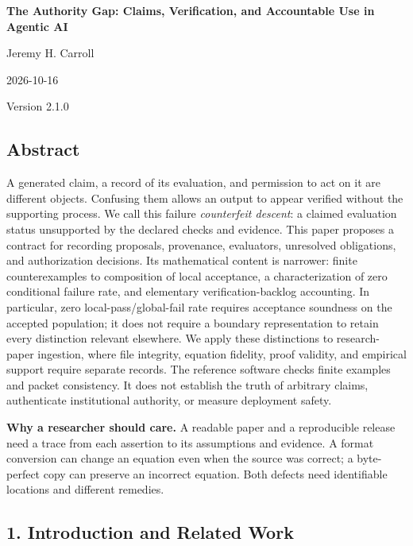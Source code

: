 \documentclass[
  10pt,
]{article}
\author{}
\date{}
\begin{document}
\begin{center}
{\LARGE\bfseries The Authority Gap: Claims, Verification, and Accountable Use in Agentic
AI\par}
Jeremy H. Carroll\par
2026-10-16\par
Version 2.1.0\par
\end{center}

\subsection{Abstract}\label{abstract}

A generated claim, a record of its evaluation, and permission to act on it are different objects. Confusing them allows an output to appear verified without the supporting process. We call this failure \emph{counterfeit descent}: a claimed evaluation status unsupported by the declared checks and evidence. This paper proposes a contract for recording proposals, provenance, evaluators, unresolved obligations, and authorization decisions. Its mathematical content is narrower: finite counterexamples to composition of local acceptance, a characterization of zero conditional failure rate, and elementary verification-backlog accounting. In particular, zero local-pass/global-fail rate requires acceptance soundness on the accepted population; it does not require a boundary representation to retain every distinction relevant elsewhere. We apply these distinctions to research-paper ingestion, where file integrity, equation fidelity, proof validity, and empirical support require separate records. The reference software checks finite examples and packet consistency. It does not establish the truth of arbitrary claims, authenticate institutional authority, or measure deployment safety.

\textbf{Why a researcher should care.} A readable paper and a reproducible release need a trace from each assertion to its assumptions and evidence. A format conversion can change an equation even when the source was correct; a byte-perfect copy can preserve an incorrect equation. Both defects need identifiable locations and different remedies.

\subsection{1. Introduction and Related Work}\label{introduction-and-related-work}
\end{document}

